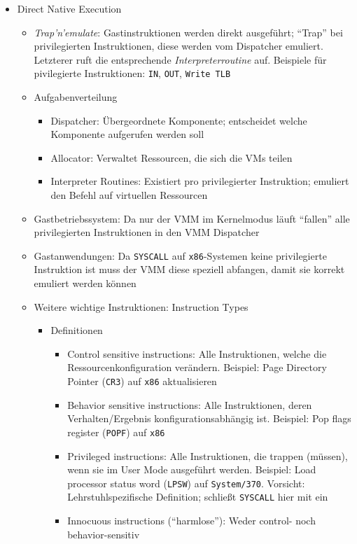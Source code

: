 \begin{itemize}
\begin{itemize}
\begin{itemize}
		\end{itemize}
		\item Direct Native Execution
		\begin{itemize}
			\item \textit{Trap'n'emulate}: Gastinstruktionen werden direkt ausgeführt; "`Trap"' bei privilegierten Instruktionen, diese werden vom Dispatcher emuliert. Letzterer ruft die entsprechende \textit{Interpreterroutine} auf. Beispiele für pivilegierte Instruktionen: \texttt{IN}, \texttt{OUT}, \texttt{Write TLB}
			\item Aufgabenverteilung
			\begin{itemize}
				\item Dispatcher: Übergeordnete Komponente; entscheidet welche Komponente aufgerufen werden soll
				\item Allocator: Verwaltet Ressourcen, die sich die VMs teilen
				\item Interpreter Routines: Existiert pro privilegierter Instruktion; emuliert den Befehl auf virtuellen Ressourcen %
			\end{itemize}
			\item Gastbetriebssystem: Da nur der VMM im Kernelmodus läuft "`fallen"' alle privilegierten Instruktionen in den VMM Dispatcher
			\item Gastanwendungen: Da \texttt{SYSCALL} auf \texttt{x86}-Systemen keine privilegierte Instruktion ist muss der VMM diese speziell abfangen, damit sie korrekt emuliert werden können
			\item Weitere wichtige Instruktionen: Instruction Types
			\begin{itemize}
				\item Definitionen
				\begin{itemize}
					\item Control sensitive instructions: Alle Instruktionen, welche die Ressourcenkonfiguration verändern. Beispiel: Page Directory Pointer (\texttt{CR3}) auf \texttt{x86} aktualisieren
					\item Behavior sensitive instructions: Alle Instruktionen, deren Verhalten/Ergebnis konfigurationsabhängig ist. Beispiel: Pop flags register (\texttt{POPF}) auf \texttt{x86}
					\item Privileged instructions: Alle Instruktionen, die trappen (müssen), wenn sie im User Mode ausgeführt werden. Beispiel: Load processor status word (\texttt{LPSW}) auf \texttt{System/370}. Vorsicht: Lehrstuhlspezifische Definition; schließt \texttt{SYSCALL} hier mit ein
					\item Innocuous instructions ("`harmlose"'): Weder control- noch behavior-sensitiv

\end{itemize}
\end{itemize}
\end{itemize}
\end{itemize}
\end{itemize}
